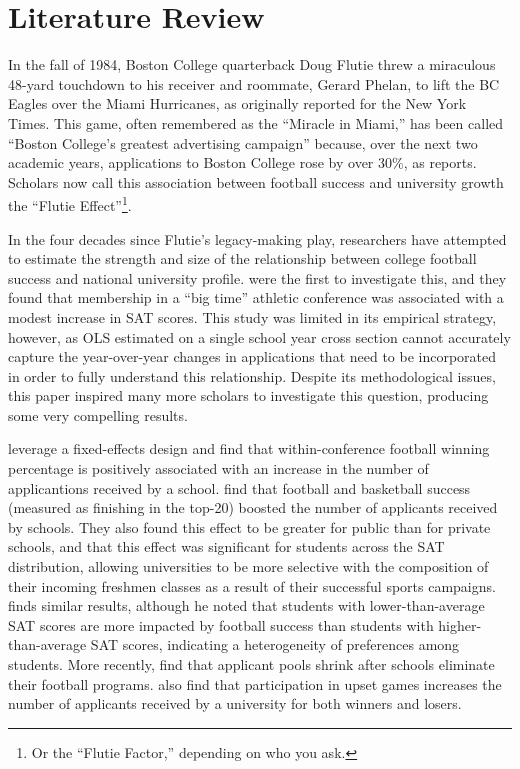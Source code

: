 \documentclass[12pt,english]{article}
\begin{document}
\section{Literature Review}
In the fall of 1984, Boston College quarterback Doug Flutie threw a miraculous 48-yard touchdown to his receiver and roommate, Gerard Phelan, to lift the BC Eagles over the Miami Hurricanes, as \citet{eskenazi1984} originally reported for the New York Times. This game, often remembered as the “Miracle in Miami,” has been called “Boston College’s greatest advertising campaign” because, over the next two academic years, applications to Boston College rose by over 30\%, as \citet{silverthorn13} reports. Scholars now call this association between football success and university growth the ``Flutie Effect”\footnote{Or the ``Flutie Factor,” depending on who you ask.}.

In the four decades since Flutie's legacy-making play, researchers have attempted to estimate the strength and size of the relationship between college football success and national university profile. \citet{mccormick} were the first to investigate this, and they found that membership in a “big time” athletic conference was associated with a modest increase in SAT scores. This study was limited in its empirical strategy, however, as OLS estimated on a single school year cross section cannot accurately capture the year-over-year changes in applications that need to be incorporated in order to fully understand this relationship. Despite its methodological issues, this paper inspired many more scholars to investigate this question, producing some very compelling results. 

\citet{Murphy1994} leverage a fixed-effects design and find that within-conference football winning percentage is positively associated with an increase in the number of applicantions received by a school. \citet{pope2009} find that football and basketball success (measured as finishing in the top-20) boosted the number of applicants received by schools. They also found this effect to be greater for public than for private schools, and that this effect was significant for students across the SAT distribution, allowing universities to be more selective with the composition of their incoming freshmen classes as a result of their successful sports campaigns. \citet{chung} finds similar results, although he noted that students with lower-than-average SAT scores are more impacted by football success than students with higher-than-average SAT scores, indicating a heterogeneity of preferences among students. More recently, \citet{caudill} find that applicant pools shrink after schools eliminate their football programs. \citet{eggers2021} also find that participation in upset games increases the number of applicants received by a university for both winners and losers.  
\end{document}
